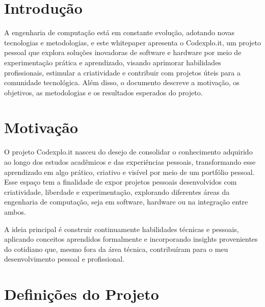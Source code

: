 \documentclass[10pt, a4paper, oneside]{article}
\begin{document}



\section{Introdução}

A engenharia de computação está em constante evolução, adotando novas tecnologias e metodologias, e este whitepaper apresenta o Codexplo.it, um projeto pessoal que explora soluções inovadoras de software e hardware por meio de experimentação prática e aprendizado, visando aprimorar habilidades profissionais, estimular a criatividade e contribuir com projetos úteis para a comunidade tecnológica. Além disso, o documento descreve a motivação, os objetivos, as metodologias e os resultados esperados do projeto.

\section{Motivação}

O projeto Codexplo.it nasceu do desejo de consolidar o conhecimento adquirido ao longo dos estudos acadêmicos e das experiências pessoais, transformando esse aprendizado em algo prático, criativo e visível por meio de um portfólio pessoal. Esse espaço tem a finalidade de expor projetos pessoais desenvolvidos com criatividade, liberdade e experimentação, explorando diferentes áreas da engenharia de computação, seja em software, hardware ou na integração entre ambos.\newline

A ideia principal é construir continuamente habilidades técnicas e pessoais, aplicando conceitos aprendidos formalmente e incorporando insights provenientes do cotidiano que, mesmo fora da área técnica, contribuíram para o meu desenvolvimento pessoal e profissional.\newpage

\section{Definições do Projeto}
\end{document}
